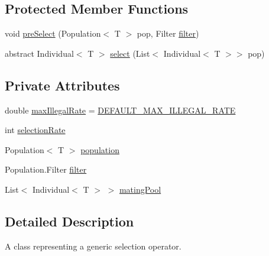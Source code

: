 \subsection*{Protected Member Functions}
\begin{DoxyCompactItemize}
\item 
void \hyperlink{classjenes_1_1stage_1_1operator_1_1_selector_3_01_t_01extends_01_chromosome_01_4_a752bf2650cbb6760d2fbb68718d62328}{pre\-Select} (Population$<$ T $>$ pop, Filter \hyperlink{classjenes_1_1stage_1_1operator_1_1_selector_3_01_t_01extends_01_chromosome_01_4_a97edf7b8ca9fba4022fcd344dd4b7ac8}{filter})
\item 
abstract Individual$<$ T $>$ \hyperlink{classjenes_1_1stage_1_1operator_1_1_selector_3_01_t_01extends_01_chromosome_01_4_af6cf22a6d6e70ffd74ee1f042a16dcd9}{select} (List$<$ Individual$<$ T $>$$>$ pop)
\end{DoxyCompactItemize}
\subsection*{Private Attributes}
\begin{DoxyCompactItemize}
\item 
double \hyperlink{classjenes_1_1stage_1_1operator_1_1_selector_3_01_t_01extends_01_chromosome_01_4_a7df661788b5a1e32113a97605142ae72}{max\-Illegal\-Rate} = \hyperlink{classjenes_1_1stage_1_1operator_1_1_selector_3_01_t_01extends_01_chromosome_01_4_a81263464a18d2ee1ecddf41f2e97fd89}{D\-E\-F\-A\-U\-L\-T\-\_\-\-M\-A\-X\-\_\-\-I\-L\-L\-E\-G\-A\-L\-\_\-\-R\-A\-T\-E}
\item 
int \hyperlink{classjenes_1_1stage_1_1operator_1_1_selector_3_01_t_01extends_01_chromosome_01_4_a11b6117214c1a39e14d203743a791a72}{selection\-Rate}
\item 
Population$<$ T $>$ \hyperlink{classjenes_1_1stage_1_1operator_1_1_selector_3_01_t_01extends_01_chromosome_01_4_ac9005eb864a25ff7bf3f68ebbb9192d1}{population}
\item 
Population.\-Filter \hyperlink{classjenes_1_1stage_1_1operator_1_1_selector_3_01_t_01extends_01_chromosome_01_4_a97edf7b8ca9fba4022fcd344dd4b7ac8}{filter}
\item 
List$<$ Individual$<$ T $>$ $>$ \hyperlink{classjenes_1_1stage_1_1operator_1_1_selector_3_01_t_01extends_01_chromosome_01_4_a9e677d5dd833315cd0996221f8681e56}{mating\-Pool}
\end{DoxyCompactItemize}


\subsection{Detailed Description}
A class representing a generic selection operator. 

